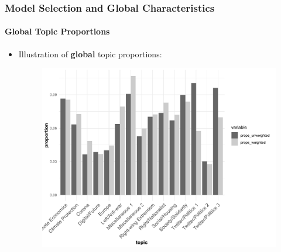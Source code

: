 \documentclass[xcolor=dvipsnames]{beamer}
\begin{document}
\begin{frame}
\frametitle{Model Selection and Global Characteristics}
\framesubtitle{Global Topic Proportions}
\begin{itemize}
\item Illustration of \textbf{global} topic proportions:
	\begin{figure}[h!]
  	\centering
  	\includegraphics[scale = 0.40]{../plots/4_3/global_thetas.pdf}
	\end{figure}
\end{itemize}
\end{frame}
\end{document}
